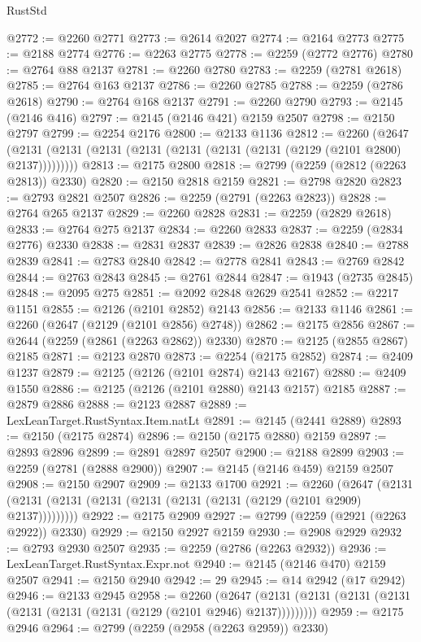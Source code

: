 \begin{lexlean}{RustStd}
\begin{coremodule}
@2772 := @2260 @2771
@2773 := @2614 @2027
@2774 := @2164 @2773
@2775 := @2188 @2774
@2776 := @2263 @2775
@2778 := @2259 (@2772 @2776)
@2780 := @2764 @88 @2137
@2781 := @2260 @2780
@2783 := @2259 (@2781 @2618)
@2785 := @2764 @163 @2137
@2786 := @2260 @2785
@2788 := @2259 (@2786 @2618)
@2790 := @2764 @168 @2137
@2791 := @2260 @2790
@2793 := @2145 (@2146 @416)
@2797 := @2145 (@2146 @421) @2159 @2507
@2798 := @2150 @2797
@2799 := @2254 @2176
@2800 := @2133 @1136
@2812 := @2260
    (@2647 (@2131 (@2131 (@2131 (@2131 (@2131 (@2131 (@2131 (@2129 (@2101 @2800) @2137)))))))))
@2813 := @2175 @2800
@2818 := @2799 (@2259 (@2812 (@2263 @2813)) @2330)
@2820 := @2150 @2818 @2159
@2821 := @2798 @2820
@2823 := @2793 @2821 @2507
@2826 := @2259 (@2791 (@2263 @2823))
@2828 := @2764 @265 @2137
@2829 := @2260 @2828
@2831 := @2259 (@2829 @2618)
@2833 := @2764 @275 @2137
@2834 := @2260 @2833
@2837 := @2259 (@2834 @2776) @2330
@2838 := @2831 @2837
@2839 := @2826 @2838
@2840 := @2788 @2839
@2841 := @2783 @2840
@2842 := @2778 @2841
@2843 := @2769 @2842
@2844 := @2763 @2843
@2845 := @2761 @2844
@2847 := @1943 (@2735 @2845)
@2848 := @2095 @275
@2851 := @2092 @2848 @2629 @2541
@2852 := @2217 @1151
@2855 := @2126 (@2101 @2852) @2143
@2856 := @2133 @1146
@2861 := @2260 (@2647 (@2129 (@2101 @2856) @2748))
@2862 := @2175 @2856
@2867 := @2644 (@2259 (@2861 (@2263 @2862)) @2330)
@2870 := @2125 (@2855 @2867) @2185
@2871 := @2123 @2870
@2873 := @2254 (@2175 @2852)
@2874 := @2409 @1237
@2879 := @2125 (@2126 (@2101 @2874) @2143 @2167)
@2880 := @2409 @1550
@2886 := @2125 (@2126 (@2101 @2880) @2143 @2157) @2185
@2887 := @2879 @2886
@2888 := @2123 @2887
@2889 := LexLeanTarget.RustSyntax.Item.natLt
@2891 := @2145 (@2441 @2889)
@2893 := @2150 (@2175 @2874)
@2896 := @2150 (@2175 @2880) @2159
@2897 := @2893 @2896
@2899 := @2891 @2897 @2507
@2900 := @2188 @2899
@2903 := @2259 (@2781 (@2888 @2900))
@2907 := @2145 (@2146 @459) @2159 @2507
@2908 := @2150 @2907
@2909 := @2133 @1700
@2921 := @2260
    (@2647 (@2131 (@2131 (@2131 (@2131 (@2131 (@2131 (@2131 (@2129 (@2101 @2909) @2137)))))))))
@2922 := @2175 @2909
@2927 := @2799 (@2259 (@2921 (@2263 @2922)) @2330)
@2929 := @2150 @2927 @2159
@2930 := @2908 @2929
@2932 := @2793 @2930 @2507
@2935 := @2259 (@2786 (@2263 @2932))
@2936 := LexLeanTarget.RustSyntax.Expr.not
@2940 := @2145 (@2146 @470) @2159 @2507
@2941 := @2150 @2940
@2942 := 29
@2945 := @14 @2942 (@17 @2942)
@2946 := @2133 @2945
@2958 := @2260
    (@2647 (@2131 (@2131 (@2131 (@2131 (@2131 (@2131 (@2131 (@2129 (@2101 @2946) @2137)))))))))
@2959 := @2175 @2946
@2964 := @2799 (@2259 (@2958 (@2263 @2959)) @2330)

\end{coremodule}
\end{lexlean}
